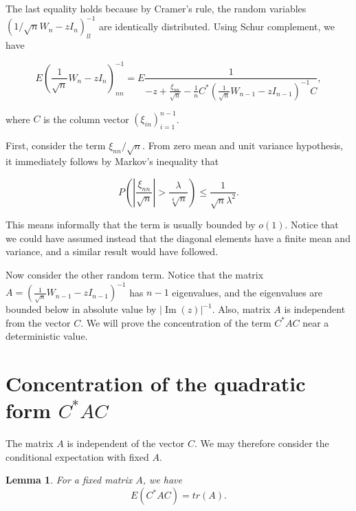 \documentclass[12pt,a4paper,leqno]{report}
\renewcommand{\Im}{\operatorname{Im}}
\theoremstyle{plain}
\newtheorem{lem}[equation]{Lemma}
\theoremstyle{definition}
\theoremstyle{remark}
\begin{document}
The last equality holds because by Cramer's rule, the random variables $(1/\sqrt{n} W_n - z I_n)^{-1}_{ll}$ are identically distributed.
Using Schur complement, we have

\begin{equation*}
E(\frac{1}{\sqrt{n}}W_n - z I_n)^{-1}_{nn} = E\frac{1}{-z+\frac{\xi_{nn}}{\sqrt{n}}-\frac{1}{n}C^* (\frac{1}{\sqrt{n}}W_{n-1}-zI_{n-1})^{-1}C},
\end{equation*}

where $C$ is the column vector $(\xi_{in})_{i=1}^{n-1}$.

First, consider the term $\xi_{nn}/\sqrt{n}$. From zero mean and unit variance hypothesis, it immediately follows by Markov's inequality that

\begin{equation*}
P(|\frac{\xi_{nn}}{\sqrt{n}}|>\frac{\lambda}{\sqrt[4]{n}}) \leq \frac{1}{\sqrt{n}\lambda^2}. 
\end{equation*}

This means informally that the term is usually bounded by $o(1)$. Notice that we could have assumed instead that the diagonal elements have a finite mean and variance, and a similar result would have followed.

Now consider the other random term. Notice that the matrix $A = (\frac{1}{\sqrt{n}}W_{n-1}-zI_{n-1})^{-1}$ has $n-1$ eigenvalues, and the eigenvalues are bounded below in absolute value by $|\Im(z)|^{-1}$. Also, matrix $A$ is independent from the vector $C$. We will prove the concentration of the term $C^* A C$ near a deterministic value.

\section{Concentration of the quadratic form $C^* A C$}

The matrix $A$ is independent of the vector $C$. We may therefore consider the conditional expectation with fixed $A$.

\begin{lem}
For a fixed matrix $A$, we have
\begin{equation*}
E(C^* A C) = tr(A).
\end{equation*}
\end{lem}
\end{document}
